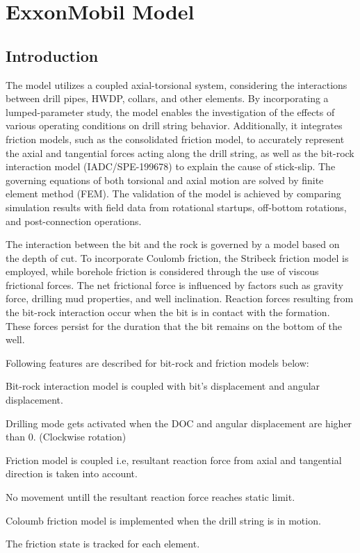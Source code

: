 \chapter{ExxonMobil Model}
\label{ch:exxonmobilmodel}

\section{Introduction}

The model utilizes a coupled axial-torsional system, considering the interactions between drill pipes, HWDP, collars, and other elements. By incorporating a lumped-parameter study, the model enables the investigation of the effects of various operating conditions on drill string behavior. Additionally, it integrates friction models, such as the consolidated friction model, to accurately represent the axial and tangential forces acting along the drill string, as well as the bit-rock interaction model (IADC/SPE-199678) to explain the cause of stick-slip. The governing equations of both torsional and axial motion are solved by finite element method (FEM). The validation of the model is achieved by comparing simulation results with field data from rotational startups, off-bottom rotations, and post-connection operations. 

The interaction between the bit and the rock is governed by a model based on the depth of cut. To incorporate Coulomb friction, the Stribeck friction model is employed, while borehole friction is considered through the use of viscous frictional forces. The net frictional force is influenced by factors such as gravity force, drilling mud properties, and well inclination. Reaction forces resulting from the bit-rock interaction occur when the bit is in contact with the formation. These forces persist for the duration that the bit remains on the bottom of the well. 

Following features are described for bit-rock and friction models below:
\begin{bulletedlist}
    \item Bit-rock interaction model is coupled with bit's displacement and angular displacement.
    \item Drilling mode gets activated when the DOC and angular displacement are higher than 0. (Clockwise rotation) 
    \item Friction model is coupled i.e, resultant reaction force from axial and tangential direction is taken into account.
    \item No movement untill the resultant reaction force reaches static limit.
    \item Coloumb friction model is implemented when the drill string is in motion.
    \item The friction state is tracked for each element.
\end{bulletedlist}

